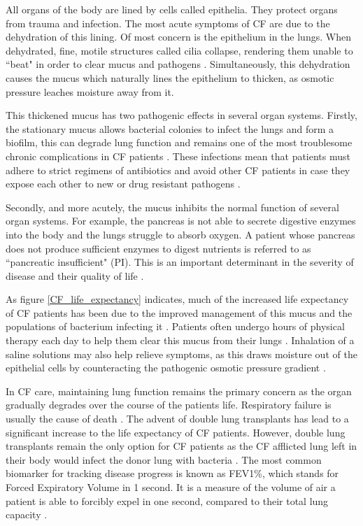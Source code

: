 All organs of the body are lined by cells called epithelia. They protect organs from trauma and infection. The most acute symptoms of CF are due to the dehydration of this lining. Of most concern is the epithelium in the lungs. When dehydrated, fine, motile structures called cilia collapse, rendering them unable to ``beat" in order to clear mucus and pathogens \cite{boucher2007, szczesniak2017}. Simultaneously, this dehydration causes the mucus which naturally lines the epithelium to thicken, as osmotic pressure leaches moisture away from it. 

This thickened mucus has two pathogenic effects in several organ systems. Firstly, the stationary mucus allows bacterial colonies to infect the lungs and form a biofilm, this can degrade lung function and remains one of the most troublesome chronic complications in CF patients \cite{chiappini2014}. These infections mean that patients must adhere to strict regimens of antibiotics and avoid other CF patients in case they expose each other to new or drug resistant pathogens \cite{conway2008}. 

Secondly, and more acutely, the mucus inhibits the normal function of several organ systems. For example, the pancreas is not able to secrete digestive enzymes into the body and the lungs struggle to absorb oxygen. A patient whose pancreas does not produce sufficient enzymes to digest nutrients is referred to as ``pancreatic insufficient" (PI). This is an important determinant in the severity of disease and their quality of life \cite{halloran2011,singh2017}.

As figure \ref{CF_life_expectancy} indicates, much of the increased life expectancy of CF patients has been due to the improved management of this mucus and the populations of bacterium infecting it \cite{mcbennett2022}. Patients often undergo hours of physical therapy each day to help them clear this mucus from their lungs \cite{chest_pt_CFF,thefreylife2015}. Inhalation of a saline solutions may also help relieve symptoms, as this draws moisture out of the epithelial cells by counteracting the pathogenic osmotic pressure gradient \cite{wark2018}. 

In CF care, maintaining lung function remains the primary concern as the organ gradually degrades over the course of the patients life. Respiratory failure is usually the cause of death \cite{kumar2018}. The advent of double lung transplants has lead to a significant increase to the life expectancy of CF patients. However, double lung transplants remain the only option for CF patients as the CF afflicted lung left in their body would infect the donor lung with bacteria \cite{mcbennett2022}. The most common biomarker for tracking disease progress is known as FEV1\%, which stands for Forced Expiratory Volume in 1 second. It is a measure of the volume of air a patient is able to forcibly expel in one second, compared to their total lung capacity \cite{szczesniak2017}. 

